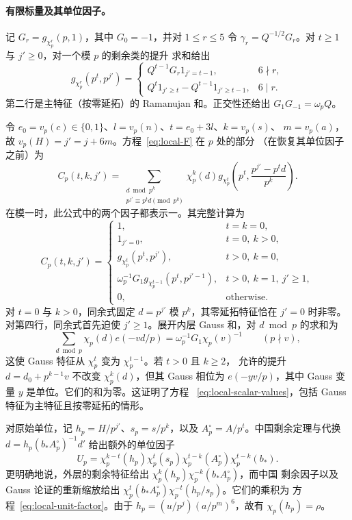 \documentclass[11pt,a4paper]{article}
\numberwithin{equation}{section}
\numberwithin{figure}{section}
\theoremstyle{definition}
\theoremstyle{remark}
\begin{document}
\paragraph{有限标量及其单位因子。}
记 $G_r=g_{\chi_p^r}(p,1)$，其中 $G_0=-1$，并对 $1\le r\le5$ 令
$\gamma_r=Q^{-1/2}G_r$。对 $t\ge1$ 与 $j'\ge0$，对一个模 $p$ 的剩余类的提升
求和给出
\[
 g_{\chi_p^r}(p^t,p^{j'})=
 \begin{cases}
 Q^{t-1}G_r1_{j'=t-1},&6\nmid r,\\
 Q^t1_{j'\ge t}-Q^{t-1}1_{j'\ge t-1},&6\mid r.
 \end{cases}
\]
第二行是主特征（按零延拓）的 Ramanujan 和。正交性还给出
$G_1G_{-1}=\omega_pQ$。

令 $e_0=v_p(c)\in\{0,1\}$、$l=v_p(n)$、$t=e_0+3l$、$k=v_p(s)$、
$m=v_p(a)$，故 $v_p(H)=j'=j+6m$。方程~\eqref{eq:local-F} 在 $p$ 处的部分
（在恢复其单位因子之前）为
\begin{equation}\label{eq:local-scalar-definition}
 C_p(t,k,j')=
 \sum_{\substack{d\bmod p^k\\p^{j'}\equiv p^td\pmod{p^k}}}
 \chi_p^k(d)
 g_{\chi_p^t}\!\left(p^t,\frac{p^{j'}-p^td}{p^k}\right).
\end{equation}
在模一时，此公式中的两个因子都表示一。其完整计算为
\begin{equation}\label{eq:local-scalar-values}
 C_p(t,k,j')=
 \begin{cases}
 1,&t=k=0,\\
 1_{j'=0},&t=0,\ k>0,\\
 g_{\chi_p^t}(p^t,p^{j'}),&t>0,\ k=0,\\
 \omega_p^{-1}G_1g_{\chi_p^{t-1}}(p^t,p^{j'-1}),
                      &t>0,\ k=1,\ j'\ge1,\\
 0,&\text{otherwise}.
 \end{cases}
\end{equation}
对 $t=0$ 与 $k>0$，同余式固定 $d=p^{j'}$ 模 $p^k$，其零延拓特征恰在
$j'=0$ 时非零。对第四行，同余式首先迫使 $j'\ge1$。展开内层 Gauss 和，对
$d\bmod p$ 的求和为
\[
 \sum_{d\bmod p}\chi_p(d)e(-vd/p)
       =\omega_p^{-1}G_1\chi_p(v)^{-1}
       \qquad(p\nmid v),
\]
这使 Gauss 特征从 $\chi_p^t$ 变为 $\chi_p^{t-1}$。若 $t>0$ 且 $k\ge2$，
允许的提升 $d=d_0+p^{k-1}v$ 不改变 $\chi_p^k(d)$，但其 Gauss 相位为
$e(-yv/p)$，其中 Gauss 变量 $y$ 是单位。它们的和为零。这证明了方程
~\eqref{eq:local-scalar-values}，包括 Gauss 特征为主特征且按零延拓的情形。

对原始单位，记 $h_p=H/p^{j'}$、$s_p=s/p^k$，以及
$A_p^\circ=A/p^t$。中国剩余定理与代换
$d=h_p(b_*A_p^\circ)^{-1}d'$ 给出额外的单位因子
\begin{equation}\label{eq:local-unit-factor}
 U_p=\chi_p^{k-t}(h_p)\chi_p^t(s_p)
       \chi_p^{t-k}(A_p^\circ)\chi_p^{t-k}(b_*).
\end{equation}
更明确地说，外层的剩余特征给出
$\chi_p^k(h_p)\chi_p^{-k}(b_*A_p^\circ)$，而中国
剩余因子以及 Gauss 论证的重新缩放给出
$\chi_p^t(b_*A_p^\circ)\chi_p^{-t}(h_p/s_p)$。它们的乘积为
方程~\eqref{eq:local-unit-factor}。由于
$h_p=(u/p^j)(a/p^m)^6$，故有 $\chi_p(h_p)=\rho$。
\end{document}
